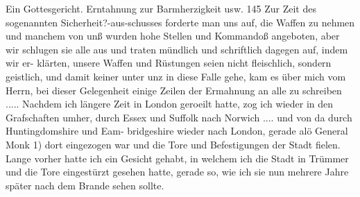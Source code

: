Ein Gottesgericht. Erntahnung zur Barmherzigkeit usw. 145
Zur Zeit des sogenannten Sicherheit?-aus-schusses forderte man uns
auf, die Waffen zu nehmen und manchem von unß wurden hohe
Stellen und Kommandoß angeboten, aber wir schlugen sie alle aus
und traten mündlich und schriftlich dagegen auf, indem wir er-
klärten, unsere Waffen und Rüstungen seien nicht fleischlich, sondern
geistlich, und damit keiner unter unz in diese Falle gehe, kam es
über mich vom Herrn, bei dieser Gelegenheit einige Zeilen der
Ermahnung an alle zu schreiben .....
Nachdem ich längere Zeit in London geroeilt hatte, zog ich
wieder in den Grafschaften umher, durch Essex und Suffolk nach
Norwich .... und von da durch Huntingdomshire und Eam-
bridgeshire wieder nach London, gerade alö General Monk 1) dort
eingezogen war und die Tore und Befestigungen der Stadt
fielen. Lange vorher hatte ich ein Gesicht gehabt, in welchem
ich die Stadt in Trümmer und die Tore eingestürzt gesehen
hatte, gerade so, wie ich sie nun mehrere Jahre später nach dem
Brande sehen sollte.